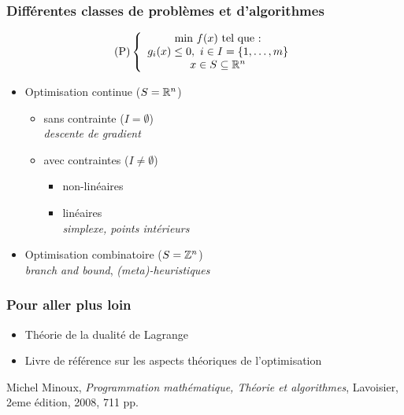 \documentclass{beamer}
\newcommand{\Z}{{\ensuremath\mathbb{Z}}}
\newcommand{\R}{{\ensuremath\mathbb{R}}}
\begin{document}
\begin{frame}
  \frametitle{Différentes classes de problèmes et d'algorithmes}

  \[
  \text{(P)} \left\{
  \begin{array}{c}
    \text{min} \ f(x) \ \text{tel que :} \\
    g_i(x) \leq 0, \ i \in I = \{1, \dots, m\} \\
    x \in S \subseteq \R^n
  \end{array}
  \right.
  \]

  \begin{itemize}
  \item Optimisation continue ($S = \R^n$)
    \begin{itemize}
    \item sans contrainte ($I = \emptyset$) \\
      \emph{descente de gradient}
    \item avec contraintes ($I \neq \emptyset$) 
      \begin{itemize}
        \item non-linéaires
        \item linéaires \\
        \emph{simplexe, points intérieurs}
      \end{itemize}
    \end{itemize}
  \item Optimisation combinatoire ($S = \Z^n$)\\
    \emph{branch and bound}, \emph{(meta)-heuristiques} 
  \end{itemize}
  
\end{frame}

\begin{frame}
  \frametitle{Pour aller plus loin}

  \begin{itemize}
  \item Théorie de la dualité de Lagrange
  \end{itemize}


  \begin{itemize}
  \item Livre de référence sur les aspects théoriques de l'optimisation
  \end{itemize}

\begin{thebibliography}{alpha}
Michel Minoux, \emph{Programmation mathématique, Théorie et algorithmes}, Lavoisier, 2eme édition, 2008, 711 pp.
\end{thebibliography}

\end{frame}
\end{document}
